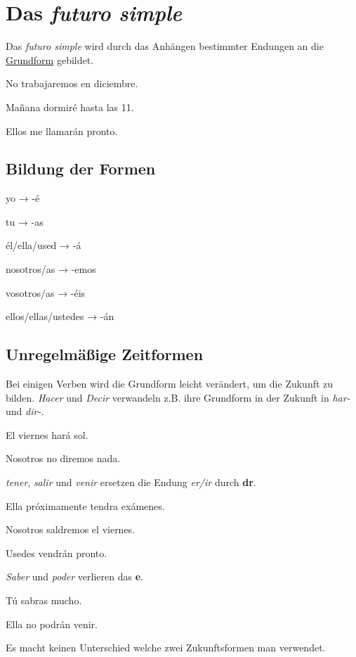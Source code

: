 \section{Das \textit{futuro simple}}
Das \textit{futuro simple} wird durch das Anhängen bestimmter 
Endungen an die \underline{Grundform} gebildet.
\begin{ejemplos}
    \item No trabajaremos en diciembre.
    \item Ma\~nana dormir\'e hasta las 11.
    \item Ellos me llamar\'an pronto.
\end{ejemplos}
\subsection*{Bildung der Formen}
\begin{gramatica}
    \item yo → -\'e
    \item tu → -as
    \item \'el/ella/used → -\'a
    \item nosotros/as → -emos
    \item vosotros/as → -\'eis
    \item ellos/ellas/ustedes → -\'an
\end{gramatica}
\subsection*{Unregelmäßige Zeitformen}
Bei einigen Verben wird die Grundform leicht verändert,
um die Zukunft zu bilden. \textit{Hacer} und \textit{Decir}
verwandeln z.B. ihre Grundform in der Zukunft in \textit{har-}
und \textit{dir-}.
\begin{ejemplos}
    \item El viernes har\'a sol.
    \item Nosotros no diremos nada.
\end{ejemplos}
\textit{tener}, \textit{salir} und \textit{venir} ersetzen
die Endung \textit{er/ir} durch \textbf{dr}.
\begin{ejemplos}
    \item Ella pr\'oximamente tendra ex\'amenes.
    \item Nosotros saldremos el viernes.
    \item Usedes vendr\'an pronto.
\end{ejemplos}
\textit{Saber} und \textit{poder} verlieren das \textbf{e}.
\begin{ejemplos}
    \item T\'u  sabras mucho.
    \item Ella no podr\'an venir.
\end{ejemplos}
Es macht keinen Unterschied welche zwei Zukunftsformen man 
verwendet.
